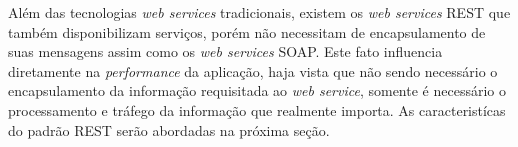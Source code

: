 	\par Além das tecnologias \textit{web services} tradicionais, existem os
\textit{web services} REST que também disponibilizam serviços, porém não
necessitam de encapsulamento de suas mensagens assim como os \textit{web
services} SOAP. Este fato influencia diretamente na \textit{performance} da
aplicação, haja vista que não sendo necessário o encapsulamento da informação
requisitada ao \textit{web service}, somente é necessário o processamento e
tráfego da informação que realmente importa. As caracteristícas do padrão REST
serão abordadas na próxima seção.